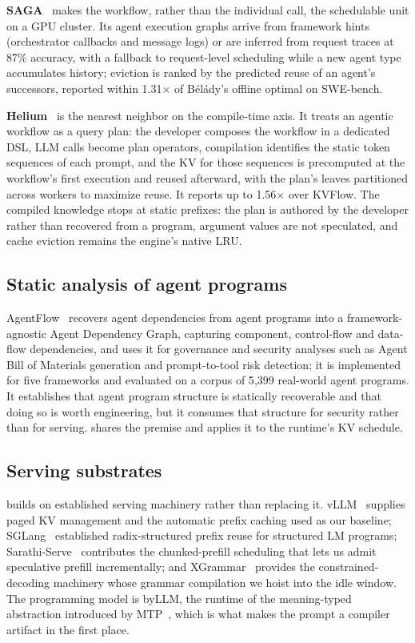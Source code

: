 \textbf{SAGA}~\cite{saga2026} makes the workflow, rather than the individual
call, the schedulable unit on a GPU cluster. Its agent execution graphs arrive
from framework hints (orchestrator callbacks and message logs) or are inferred
from request traces at 87\% accuracy, with a fallback to request-level
scheduling while a new agent type accumulates history; eviction is ranked by
the predicted reuse of an agent's successors, reported within 1.31$\times$ of
B\'el\'ady's offline optimal on SWE-bench.

\textbf{Helium}~\cite{helium2026} is the nearest neighbor on the compile-time
axis. It treats an agentic workflow as a query plan: the developer composes the
workflow in a dedicated DSL, LLM calls become plan operators, compilation
identifies the static token sequences of each prompt, and the KV for those
sequences is precomputed at the workflow's first execution and reused
afterward, with the plan's leaves partitioned across workers to maximize reuse.
It reports up to 1.56$\times$ over KVFlow. The compiled knowledge stops at
static prefixes: the plan is authored by the developer rather than recovered
from a program, argument values are not speculated, and cache eviction remains
the engine's native LRU.

\subsection{Static analysis of agent programs}

AgentFlow~\cite{wang2026agentflow} recovers agent dependencies from agent programs
into a framework-agnostic Agent Dependency Graph, capturing component, control-flow
and data-flow dependencies, and uses it for governance and security analyses such
as Agent Bill of Materials generation and prompt-to-tool risk detection; it is
implemented for five frameworks and evaluated on a corpus of 5{,}399 real-world
agent programs. It establishes that agent program structure is statically
recoverable and that doing so is worth engineering, but it consumes that structure
for security rather than for serving. \sysname{} shares the premise and applies it
to the runtime's KV schedule.

\subsection{Serving substrates}

\sysname{} builds on established serving machinery rather than replacing it.
vLLM~\cite{kwon2023pagedattention} supplies paged KV management and the automatic
prefix caching used as our baseline; SGLang~\cite{zheng2023sglang} established
radix-structured prefix reuse for structured LM programs;
Sarathi-Serve~\cite{agrawal2024sarathi} contributes the chunked-prefill scheduling
that lets us admit speculative prefill incrementally; and
XGrammar~\cite{dong2025xgrammar} provides the constrained-decoding machinery whose
grammar compilation we hoist into the idle window. The programming model is byLLM,
the runtime of the meaning-typed abstraction introduced by
MTP~\cite{dantanarayana2025mtp}, which is what makes the prompt a compiler artifact
in the first place.
